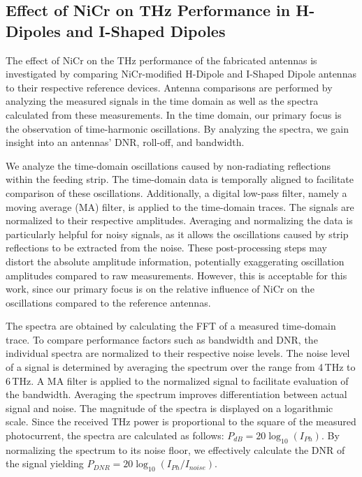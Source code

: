 \subsection{Effect of NiCr on THz Performance in H-Dipoles and I-Shaped Dipoles}

The effect of NiCr on the THz performance of the fabricated antennas is investigated by comparing NiCr-modified H-Dipole and I-Shaped Dipole antennas to their respective reference devices. Antenna comparisons are performed by analyzing the measured signals in the time domain as well as the spectra calculated from these measurements. In the time domain, our primary focus is the observation of time-harmonic oscillations. By analyzing the spectra, we gain insight into an antennas’ DNR, roll-off, and bandwidth. 

We analyze the time-domain oscillations caused by non-radiating reflections within the feeding strip. The time-domain data is temporally aligned to facilitate comparison of these oscillations. Additionally, a digital low-pass filter, namely a moving average (MA) filter, is applied to the time-domain traces. The signals are normalized to their respective amplitudes. Averaging and normalizing the data is particularly helpful for noisy signals, as it allows the oscillations caused by strip reflections to be extracted from the noise. These post-processing steps may distort the absolute amplitude information, potentially exaggerating oscillation amplitudes compared to raw measurements. However, this is acceptable for this work, since our primary focus is on the relative influence of NiCr on the oscillations compared to the reference antennas.

The spectra are obtained by calculating the FFT of a measured time-domain trace. To compare performance factors such as bandwidth and DNR, the individual spectra are normalized to their respective noise levels. The noise level of a signal is determined by averaging the spectrum over the range from \num{4}\,\si{\tera \hertz} to \num{6}\,\si{\tera \hertz}. A MA filter is applied to the normalized signal to facilitate evaluation of the bandwidth. Averaging the spectrum improves differentiation between actual signal and noise. The magnitude of the spectra is displayed on a logarithmic scale. Since the received THz power is proportional to the square of the measured photocurrent, the spectra are calculated as follows: $P_{dB} = 20\log_{10}(I_{Ph})$. By normalizing the spectrum to its noise floor, we effectively calculate the DNR of the signal yielding $P_{DNR} = 20\log_{10}(I_{Ph}/I_{noise})$.   

